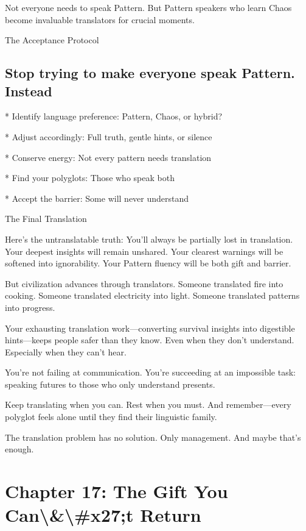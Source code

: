 \documentclass[12pt,oneside]{book}
\begin{document}
Not everyone needs to speak Pattern. But Pattern speakers who learn Chaos become invaluable translators for crucial moments.

The Acceptance Protocol

\section{Stop trying to make everyone speak Pattern. Instead}

                    * Identify language preference: Pattern, Chaos, or hybrid?

                    * Adjust accordingly: Full truth, gentle hints, or silence

                    * Conserve energy: Not every pattern needs translation

                    * Find your polyglots: Those who speak both

                    * Accept the barrier: Some will never understand

The Final Translation

Here's the untranslatable truth: You'll always be partially lost in translation. Your deepest insights will remain unshared. Your clearest warnings will be softened into ignorability. Your Pattern fluency will be both gift and barrier.

But civilization advances through translators. Someone translated fire into cooking. Someone translated electricity into light. Someone translated patterns into progress.

Your exhausting translation work---converting survival insights into digestible hints---keeps people safer than they know. Even when they don't understand. Especially when they can't hear.

You're not failing at communication. You're succeeding at an impossible task: speaking futures to those who only understand presents.

Keep translating when you can. Rest when you must. And remember---every polyglot feels alone until they find their linguistic family.

The translation problem has no solution. Only management. And maybe that's enough.

\chapter{Chapter 17: The Gift You Can\textbackslash{}&\textbackslash{}#x27;t Return}
\end{document}
